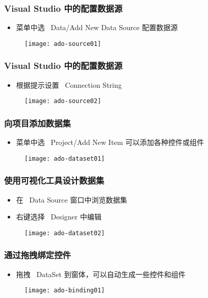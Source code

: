 \begin{frame}
\frametitle{Visual Studio 中的配置数据源}
\begin{itemize}
\item 菜单中选 ~Data/Add New Data Source 配置数据源
\end{itemize}
\begin{figure}
  \centering
  \texttt{[image: ado-source01]}
\end{figure}

\end{frame}

\begin{frame}
\frametitle{Visual Studio 中的配置数据源}
\begin{itemize}
\item 根据提示设置 ~Connection String
\end{itemize}
\begin{figure}
  \centering
  \texttt{[image: ado-source02]}
\end{figure}
\end{frame}

\begin{frame}
\frametitle{向项目添加数据集}
\begin{itemize}
\item 菜单中选 ~Project/Add New Item 可以添加各种控件或组件
\end{itemize}
\begin{figure}
  \centering
  \texttt{[image: ado-dataset01]}
\end{figure}
\end{frame}

\begin{frame}
\frametitle{使用可视化工具设计数据集}
\begin{itemize}
\item 在 ~Data Source 窗口中浏览数据集
\item 右键选择 ~Designer 中编辑
\end{itemize}
\begin{figure}
  \centering
  \texttt{[image: ado-dataset02]}
\end{figure}
\end{frame}

\begin{frame}
\frametitle{通过拖拽绑定控件}
\begin{itemize}
\item 拖拽 ~DataSet 到窗体，可以自动生成一些控件和组件
\end{itemize}
\begin{figure}
  \centering
  \texttt{[image: ado-binding01]}
\end{figure}
\end{frame}

